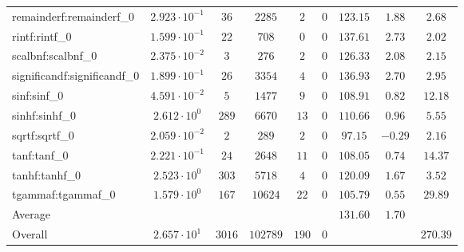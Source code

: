 \begin{tabular}{|l|c|c|c|c|c|c|c|c|}
remainderf:remainderf\_0     & $ 2.923 \cdot 10^{-1} $ & $ 36     $ & $ 2285   $ & $ 2   $ & $ 0   $ & $ 123.15      $ & $ 1.88    $ & $ 2.68    $ \\
rintf:rintf\_0               & $ 1.599 \cdot 10^{-1} $ & $ 22     $ & $ 708    $ & $ 0   $ & $ 0   $ & $ 137.61      $ & $ 2.73    $ & $ 2.02    $ \\
scalbnf:scalbnf\_0           & $ 2.375 \cdot 10^{-2} $ & $ 3      $ & $ 276    $ & $ 2   $ & $ 0   $ & $ 126.33      $ & $ 2.08    $ & $ 2.15    $ \\
significandf:significandf\_0 & $ 1.899 \cdot 10^{-1} $ & $ 26     $ & $ 3354   $ & $ 4   $ & $ 0   $ & $ 136.93      $ & $ 2.70    $ & $ 2.95    $ \\
sinf:sinf\_0                 & $ 4.591 \cdot 10^{-2} $ & $ 5      $ & $ 1477   $ & $ 9   $ & $ 0   $ & $ 108.91      $ & $ 0.82    $ & $ 12.18   $ \\
sinhf:sinhf\_0               & $ 2.612 \cdot 10^{0}  $ & $ 289    $ & $ 6670   $ & $ 13  $ & $ 0   $ & $ 110.66      $ & $ 0.96    $ & $ 5.55    $ \\
sqrtf:sqrtf\_0               & $ 2.059 \cdot 10^{-2} $ & $ 2      $ & $ 289    $ & $ 2   $ & $ 0   $ & $ 97.15       $ & $ -0.29   $ & $ 2.16    $ \\
tanf:tanf\_0                 & $ 2.221 \cdot 10^{-1} $ & $ 24     $ & $ 2648   $ & $ 11  $ & $ 0   $ & $ 108.05      $ & $ 0.74    $ & $ 14.37   $ \\
tanhf:tanhf\_0               & $ 2.523 \cdot 10^{0}  $ & $ 303    $ & $ 5718   $ & $ 4   $ & $ 0   $ & $ 120.09      $ & $ 1.67    $ & $ 3.52    $ \\
tgammaf:tgammaf\_0           & $ 1.579 \cdot 10^{0}  $ & $ 167    $ & $ 10624  $ & $ 22  $ & $ 0   $ & $ 105.79      $ & $ 0.55    $ & $ 29.89   $ \\
\hline
Average                      & $                     $ & $        $ & $        $ & $     $ & $     $ & $ 131.60      $ & $ 1.70    $ & $         $ \\
\hline
Overall                      & $ 2.657 \cdot 10^{1}  $ & $ 3016   $ & $ 102789 $ & $ 190 $ & $ 0   $ & $             $ & $         $ & $ 270.39  $ \\
\hline
\end{tabular}
